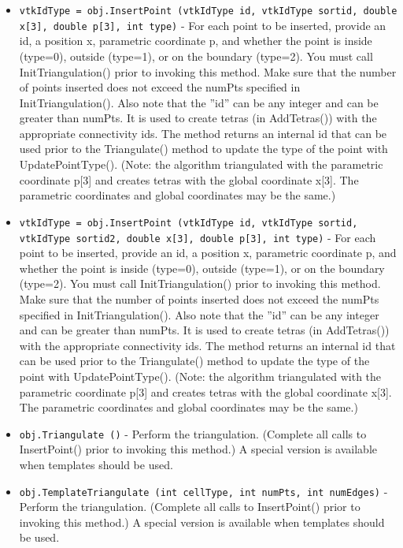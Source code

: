 \begin{itemize}
\item  \verb|vtkIdType = obj.InsertPoint (vtkIdType id, vtkIdType sortid, double x[3], double p[3], int type)| -  For each point to be inserted, provide an id, a position x, parametric
 coordinate p, and whether the point is inside (type=0), outside
 (type=1), or on the boundary (type=2). You must call InitTriangulation()
 prior to invoking this method. Make sure that the number of points
 inserted does not exceed the numPts specified in
 InitTriangulation(). Also note that the ''id'' can be any integer and can
 be greater than numPts. It is used to create tetras (in AddTetras()) with
 the appropriate connectivity ids. The method returns an internal id that
 can be used prior to the Triangulate() method to update the type of the
 point with UpdatePointType(). (Note: the algorithm triangulated with the
 parametric coordinate p[3] and creates tetras with the global coordinate
 x[3]. The parametric coordinates and global coordinates may be the same.)

\item  \verb|vtkIdType = obj.InsertPoint (vtkIdType id, vtkIdType sortid, vtkIdType sortid2, double x[3], double p[3], int type)| -  For each point to be inserted, provide an id, a position x, parametric
 coordinate p, and whether the point is inside (type=0), outside
 (type=1), or on the boundary (type=2). You must call InitTriangulation()
 prior to invoking this method. Make sure that the number of points
 inserted does not exceed the numPts specified in
 InitTriangulation(). Also note that the ''id'' can be any integer and can
 be greater than numPts. It is used to create tetras (in AddTetras()) with
 the appropriate connectivity ids. The method returns an internal id that
 can be used prior to the Triangulate() method to update the type of the
 point with UpdatePointType(). (Note: the algorithm triangulated with the
 parametric coordinate p[3] and creates tetras with the global coordinate
 x[3]. The parametric coordinates and global coordinates may be the same.)

\item  \verb|obj.Triangulate ()| -  Perform the triangulation. (Complete all calls to InsertPoint() prior
 to invoking this method.) A special version is available when templates
 should be used.

\item  \verb|obj.TemplateTriangulate (int cellType, int numPts, int numEdges)| -  Perform the triangulation. (Complete all calls to InsertPoint() prior
 to invoking this method.) A special version is available when templates
 should be used.


\end{itemize}
